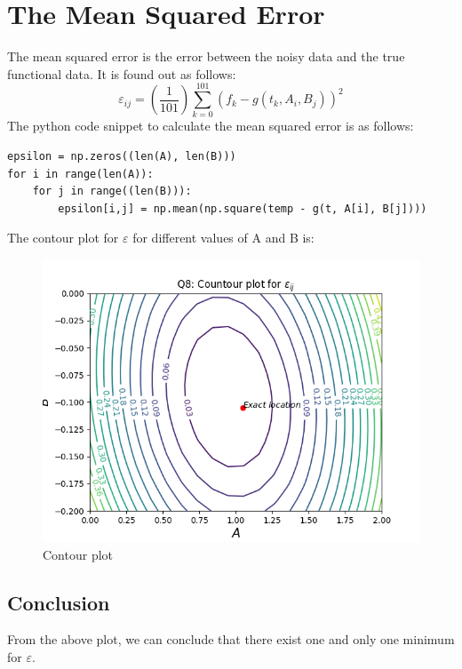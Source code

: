 \documentclass[11pt, a4paper]{article}
\begin{document}
\section{The Mean Squared Error}
The mean squared error is the error between the noisy data and the true functional data. It is found out as follows:
$$\varepsilon_{ij} = (\frac{1}{101})\sum_{k=0}^{101}(f_{k} - g(t_{k},A_{i},B_{j}))^{2}$$
The python code snippet to calculate the mean squared error is as follows:
\begin{verbatim}	
epsilon = np.zeros((len(A), len(B)))
for i in range(len(A)):
    for j in range((len(B))):
        epsilon[i,j] = np.mean(np.square(temp - g(t, A[i], B[j])))
\end{verbatim}
The contour plot for $\varepsilon$ for different values of A and B is:
	\begin{figure}[!tbh]
   	\centering
   	\includegraphics[scale=0.5]{Figure_Q8.png}   
   	\caption{Contour plot}
   	\label{fig:sample}
   \end{figure} 
     
\subsection*{Conclusion}
From the above plot, we can conclude that there exist one and only one minimum for $\varepsilon$.
\end{document}
